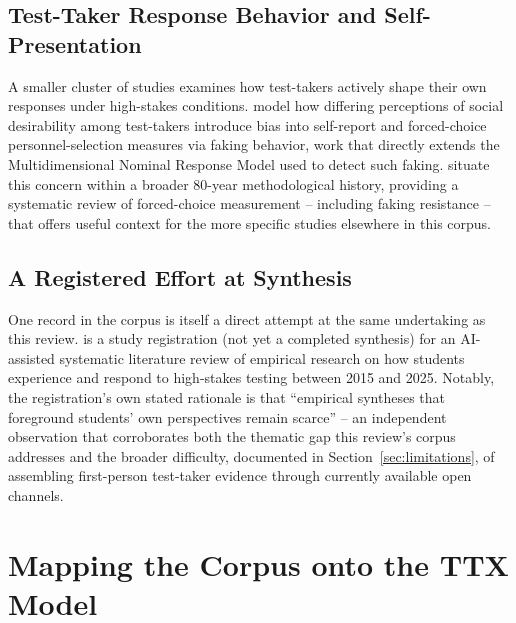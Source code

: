\documentclass[11pt]{article}
\begin{document}
\subsection{Test-Taker Response Behavior and Self-Presentation}

A smaller cluster of studies examines how test-takers actively shape their own responses under high-stakes conditions. \citet{kleinbub2026socialdesirability} model how differing perceptions of social desirability among test-takers introduce bias into self-report and forced-choice personnel-selection measures via faking behavior, work that directly extends the Multidimensional Nominal Response Model used to detect such faking. \citet{lee2025forcedchoice} situate this concern within a broader 80-year methodological history, providing a systematic review of forced-choice measurement -- including faking resistance -- that offers useful context for the more specific studies elsewhere in this corpus.

\subsection{A Registered Effort at Synthesis}

One record in the corpus is itself a direct attempt at the same undertaking as this review. \citet{kaleta2025studentperspectives} is a study registration (not yet a completed synthesis) for an AI-assisted systematic literature review of empirical research on how students experience and respond to high-stakes testing between 2015 and 2025. Notably, the registration's own stated rationale is that ``empirical syntheses that foreground students' own perspectives remain scarce'' -- an independent observation that corroborates both the thematic gap this review's corpus addresses and the broader difficulty, documented in Section~\ref{sec:limitations}, of assembling first-person test-taker evidence through currently available open channels.

\section{Mapping the Corpus onto the TTX Model}
\label{sec:mapping}
\end{document}
